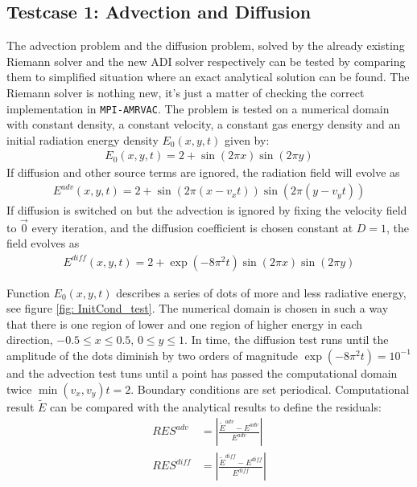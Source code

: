 \subsection{Testcase 1: Advection and Diffusion}\label{section: res: diff_test}
The advection problem and the diffusion problem, solved by the already existing Riemann solver and the new ADI solver respectively can be tested by comparing them to simplified situation where an exact analytical solution can be found. The Riemann solver is nothing new, it's just a matter of checking the correct implementation in \texttt{MPI-AMRVAC}. The problem is tested on a numerical domain with constant density, a constant velocity, a constant gas energy density and an initial radiation energy density $E_0(x,y,t)$ given by:
\begin{align}
E_0(x,y,t) = 2 + \sin(2 \pi x) \sin(2 \pi y)
\end{align}
If diffusion and other source terms are ignored, the radiation field will evolve as
\begin{align}
E^{adv}(x,y,t) = 2 + \sin(2 \pi (x-v_x t)) \sin(2 \pi (y-v_y t))
\end{align}
If diffusion is switched on but the advection is ignored by fixing the velocity field to $\vec{0}$ every iteration, and the diffusion coefficient is chosen constant at $D = 1$, the field evolves as
\begin{align}
E^{diff}(x,y,t) = 2 + \exp(-8 \pi^2 t) \sin(2 \pi x) \sin(2 \pi y)
\end{align}

Function $E_0(x,y,t)$ describes a series of dots of more and less radiative energy, see figure \ref{fig: InitCond_test}. The numerical domain is chosen in such a way that there is one region of lower and one region of higher energy in each direction, $-0.5 \leq x \leq 0.5$, $0 \leq y \leq 1$. In time, the diffusion test runs until the amplitude of the dots diminish by two orders of magnitude $\exp(-8 \pi^2 t)  = 10^{-1}$ and the advection test tuns until a point has passed the computational domain twice $ \min(v_x, v_y) t = 2 $. Boundary conditions are set periodical. Computational result $\tilde{E}$ can be compared with the analytical results to define the residuals:
\begin{align}
RES^{adv} &= \left|\frac{\tilde{E}^{adv} - E^{adv}}{E^{adv}}\right| \\
RES^{diff} &= \left|\frac{\tilde{E}^{diff} - E^{diff}}{E^{diff}}\right| 
\end{align}


